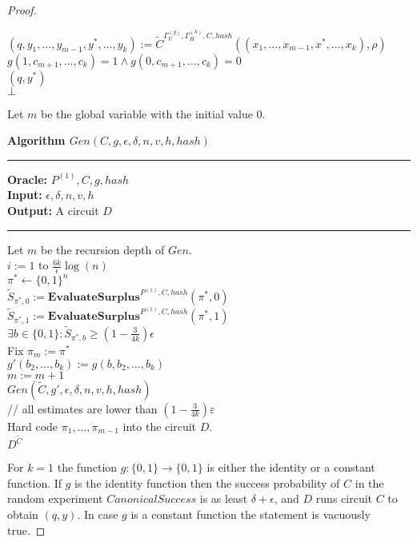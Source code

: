\begin{proof}
\begin{codeblock}
  \IndI $(q,y_1, \dots, y_{m-1}, y^*, \dots, y_k) := \widetilde{C}^{\Gamma_V^{(g)}, \Gamma_H^{(k)}, C, hash}((x_1, \dots, x_{m-1}, x^*, \dots, x_k), \rho)$\\
  \IndI \If $g(1,c_{m+1}, \dots, c_k) =1 \land g(0,c_{m+1}, \dots, c_k) = 0$ \then \\
  \IndII \return $(q, y^*)$ \\
  \return $\bot$
%
\end{codeblock}
%
Let $m$ be the global variable with the initial value $0$.
\begin{codeblock}
  \textbf{Algorithm $Gen(C, g, \epsilon, \delta, n, v, h, hash)$}
  \medskip
  \hrule
  \medskip
  \textbf{Oracle:} $ P^{(1)}, C, g, hash$ \\
  \textbf{Input:}  $\epsilon, \delta, n, v, h$\\
  \textbf{Output:} A circuit $D$
  \medskip\hrule\medskip
  Let $m$ be the recursion depth of $Gen$.\\
  \For $i:=1$ to $\frac{6k}{\epsilon}\log(n)$ \\
  \IndI $\pi^* \leftarrow \{0,1\}^{n}$\\
  \IndI $\widetilde{S}_{\pi^*,0} := \textbf{EvaluateSurplus}^{P^{(1)}, C, hash}(\pi^*, 0)$\\
  \IndI $\widetilde{S}_{\pi^*,1} := \textbf{EvaluateSurplus}^{P^{(1)}, C, hash}(\pi^*, 1)$\\
  \IndI \If $ \exists b \in \{0,1\}: \widetilde{S}_{\pi^*,b} \geq (1 - \frac{3}{4k}) \epsilon$ \\
  \IndII Fix $\pi_m := \pi^*$ \\
  \IndII $g'(b_2, \dots, b_k) := g(b, b_2, \dots, b_k)$\\
  \IndII $m := m + 1$\\
  \IndII\return $Gen(\widetilde{C}, g', \epsilon, \delta, n, v, h, hash)$ \\

  // all estimates are lower than $(1-\frac{3}{4k})\varepsilon$\\
  Hard code $\pi_1, \dots, \pi_{m-1}$ into the circuit $D$. \\
  \return $D^{\widetilde{C}}$
\end{codeblock}
%
%
For $k=1$ the function $g: \{0,1\} \rightarrow \{0,1\}$ is either the identity or a constant function.
If $g$ is the identity function then the success probability of $C$ in the random experiment $CanonicalSuccess$ is as least $\delta + \epsilon$,
and $D$ runs circuit $C$ to obtain $(q,y)$. In case $g$ is a constant function the statement is vacuously true.


\end{proof}
